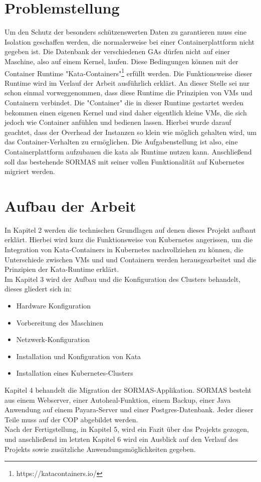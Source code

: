 \section{Problemstellung}
Um den Schutz der besonders schützenswerten Daten zu garantieren muss eine Isolation geschaffen werden, die normalerweise bei einer Containerplattform nicht gegeben ist. 
Die Datenbank der verschiedenen \ac{GAs} dürfen nicht auf einer Maschine, also auf einem Kernel, laufen.
Diese Bedingungen können mit der Container Runtime "Kata-Containers"\footnote{https://katacontainers.io/} erfüllt werden. 
Die Funktionsweise dieser Runtime wird im Verlauf der Arbeit ausführlich erklärt. 
An dieser Stelle sei nur schon einmal vorweggenommen, dass diese Runtime die Prinzipien von \ac{VM}s und Containern  verbindet. 
Die "Container" die in dieser Runtime gestartet werden bekommen einen eigenen Kernel und sind daher eigentlich kleine \ac{VM}s, die sich jedoch wie Container anfühlen und bedienen lassen.
Hierbei wurde darauf geachtet, dass der Overhead der Instanzen so klein wie möglich gehalten wird, um das Container-Verhalten zu ermöglichen.
Die Aufgabenstellung ist also, eine Containerplattform aufzubauen die kata als Runtime nutzen kann.
Anschließend soll das bestehende \ac{SORMAS} mit seiner vollen Funktionalität auf Kubernetes migriert werden.

\section{Aufbau der Arbeit}
In Kapitel 2 werden die technischen Grundlagen auf denen dieses Projekt aufbaut erklärt. 
Hierbei wird kurz die Funktionsweise von Kubernetes angerissen, um die Integration von Kata-Containers in Kubernetes nachvollziehen zu können,
die Unterschiede zwischen \ac{VM}s und und Containern werden herausgearbeitet und die Prinzipien der Kata-Runtime erklärt.
\\
Im Kapitel 3 wird der Aufbau und die Konfiguration des Clusters behandelt, dieses gliedert sich in:
\begin{itemize}
    \item Hardware Konfiguration
    \item Vorbereitung des Maschinen
    \item Netzwerk-Konfiguration
    \item Installation und Konfiguration von Kata
    \item Installation eines Kubernetes-Clusters
\end{itemize}

Kapitel 4 behandelt die Migration der \ac{SORMAS}-Applikation.
\ac{SORMAS} besteht aus einem Webserver, einer Autoheal-Funktion, einem Backup, einer Java Anwendung auf einem Payara-Server und einer Postgres-Datenbank.
Jeder dieser Teile muss auf der \ac{COP} abgebildet werden.
\\
Nach der Fertigstellung, in Kapitel 5, wird ein Fazit über das Projekts gezogen, und anschließend im letzten Kapitel 6 wird ein Ausblick auf den Verlauf des Projekts sowie zusätzliche Anwendungsmöglichkeiten gegeben.
